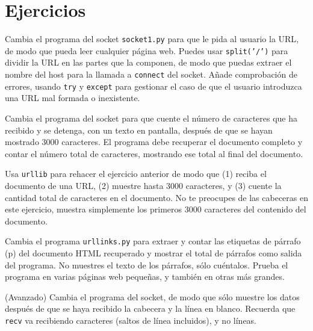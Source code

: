 \section{Ejercicios}

\begin{ex}
Cambia el programa del socket {\tt socket1.py} para que le pida al usuario
la URL, de modo que pueda leer cualquier página web.
Puedes usar {\tt split('/')} para dividir la URL en las partes que la componen,
de modo que puedas extraer el nombre del host para la llamada a {\tt connect} del socket.
Añade comprobación de errores, usando {\tt try} y {\tt except} para gestionar el caso de que
el usuario introduzca una URL mal formada o inexistente.  
\end{ex}

\begin{ex}
Cambia el programa del socket para que cuente el número de caracteres que ha recibido
y se detenga, con un texto en pantalla, después de que se hayan mostrado 3000 caracteres. El programa
debe recuperar el documento completo y contar el número total de caracteres,
mostrando ese total al final del documento.
\end{ex}

\begin{ex}
Usa {\tt urllib} para rehacer el ejercicio anterior de modo que (1) reciba el documento
de una URL, (2) muestre hasta 3000 caracteres, y (3) cuente la cantidad total
de caracteres en el documento. No te preocupes de las cabeceras en este ejercicio,
muestra simplemente los primeros 3000 caracteres del contenido del documento.
\end{ex}

\begin{ex}
Cambia el programa {\tt urllinks.py} para extraer y contar
las etiquetas de párrafo (p) del documento HTML recuperado y
mostrar el total de párrafos como
salida del programa.
No muestres el texto de los párrafos, sólo cuéntalos.
Prueba el programa en varias páginas web pequeñas,
y también en otras más grandes.
\end{ex}

\begin{ex}
(Avanzado) Cambia el programa del socket, de modo que sólo muestre los datos
después de que se haya recibido la cabecera y la línea en blanco. Recuerda que {\tt recv}
va recibiendo caracteres (saltos de línea incluidos), y no líneas.
\end{ex}